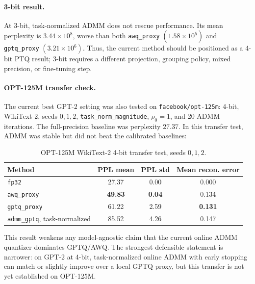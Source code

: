 \documentclass[11pt]{article}
\begin{document}
\paragraph{3-bit result.}
At 3-bit, task-normalized ADMM does not rescue performance.  Its mean
perplexity is \(3.44\times 10^8\), worse than both \texttt{awq\_proxy}
\((1.58\times 10^5)\) and \texttt{gptq\_proxy} \((3.21\times 10^6)\).
Thus, the current method should be positioned as a 4-bit PTQ result; 3-bit
requires a different projection, grouping policy, mixed precision, or
fine-tuning step.

\paragraph{OPT-125M transfer check.}
The current best GPT-2 setting was also tested on \texttt{facebook/opt-125m}:
4-bit, WikiText-2, seeds \(0,1,2\), \texttt{task\_norm\_magnitude},
\(\rho_0=1\), and 20 ADMM iterations.  The full-precision baseline was
perplexity \(27.37\).  In this transfer test, ADMM was stable but did not beat
the calibrated baselines:

\begin{table}[h]
\centering
\caption{OPT-125M WikiText-2 4-bit transfer test, seeds \(0,1,2\).}
\label{tab:opt125m-transfer}
\begin{tabular}{lccc}
\toprule
Method & PPL mean & PPL std & Mean recon. error\\
\midrule
\texttt{fp32} & 27.37 & 0.00 & 0.000\\
\texttt{awq\_proxy} & \textbf{49.83} & \textbf{0.04} & 0.134\\
\texttt{gptq\_proxy} & 61.22 & 2.59 & \textbf{0.131}\\
\texttt{admm\_gptq}, task-normalized & 85.52 & 4.26 & 0.147\\
\bottomrule
\end{tabular}
\end{table}

This result weakens any model-agnostic claim that the current online ADMM
quantizer dominates GPTQ/AWQ.  The strongest defensible statement is narrower:
on GPT-2 at 4-bit, task-normalized online ADMM with early stopping can match or
slightly improve over a local GPTQ proxy, but this transfer is not yet
established on OPT-125M.
\end{document}
